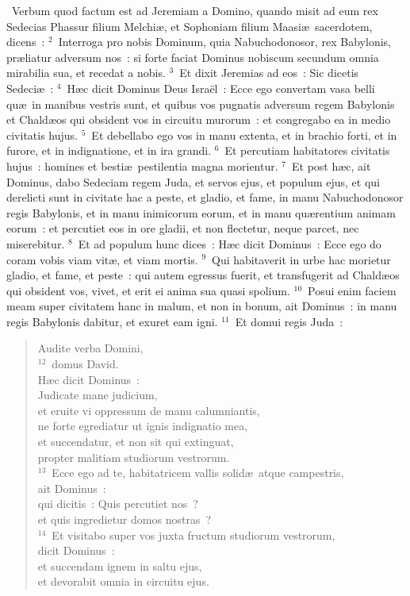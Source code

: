 ~\lettrine[lines=10,image=true,loversize=0.05,lraise=-0.03]{V}{}erbum quod factum est ad Jeremiam a Domino, quando misit ad eum rex Sedecias Phassur filium Melchi\ae , et Sophoniam filium Maasi\ae\ sacerdotem, dicens~:
${}^{2}$~Interroga pro nobis Dominum, quia Nabuchodonosor, rex Babylonis, pr\ae liatur adversum nos~: si forte faciat Dominus nobiscum secundum omnia mirabilia sua, et recedat a nobis.
${}^{3}$~Et dixit Jeremias ad eos~: Sic dicetis Sedeci\ae~:
${}^{4}$~H\ae c dicit Dominus Deus Isra\"el~: Ecce ego convertam vasa belli qu\ae\ in manibus vestris sunt, et quibus vos pugnatis adversum regem Babylonis et Chald\ae os qui obsident vos in circuitu murorum~: et congregabo ea in medio civitatis hujus.
${}^{5}$~Et debellabo ego vos in manu extenta, et in brachio forti, et in furore, et in indignatione, et in ira grandi.
${}^{6}$~Et percutiam habitatores civitatis hujus~: homines et besti\ae\ pestilentia magna morientur.
${}^{7}$~Et post h\ae c, ait Dominus, dabo Sedeciam regem Juda, et servos ejus, et populum ejus, et qui derelicti sunt in civitate hac a peste, et gladio, et fame, in manu Nabuchodonosor regis Babylonis, et in manu inimicorum eorum, et in manu qu\ae rentium animam eorum~: et percutiet eos in ore gladii, et non flectetur, neque parcet, nec miserebitur.
${}^{8}$~Et ad populum hunc dices~: H\ae c dicit Dominus~: Ecce ego do coram vobis viam vit\ae , et viam mortis.
${}^{9}$~Qui habitaverit in urbe hac morietur gladio, et fame, et peste~: qui autem egressus fuerit, et transfugerit ad Chald\ae os qui obsident vos, vivet, et erit ei anima sua quasi spolium.
${}^{10}$~Posui enim faciem meam super civitatem hanc in malum, et non in bonum, ait Dominus~: in manu regis Babylonis dabitur, et exuret eam igni.
${}^{11}$~Et domui regis Juda~: \begin{flushleft}\begin{verse}Audite verba Domini,\\
${}^{12}$~domus David.\\ H\ae c dicit Dominus~:\\ Judicate mane judicium,\\ et eruite vi oppressum de manu calumniantis,\\ ne forte egrediatur ut ignis indignatio mea,\\ et succendatur, et non sit qui extinguat,\\ propter malitiam studiorum vestrorum.\\
${}^{13}$~Ecce ego ad te, habitatricem vallis solid\ae\ atque campestris,\\ ait Dominus~:\\ qui dicitis~: Quis percutiet nos~?\\ et quis ingredietur domos nostras~?\\
${}^{14}$~Et visitabo super vos juxta fructum studiorum vestrorum,\\ dicit Dominus~:\\ et succendam ignem in saltu ejus,\\ et devorabit omnia in circuitu ejus.\end{verse}\end{flushleft}


